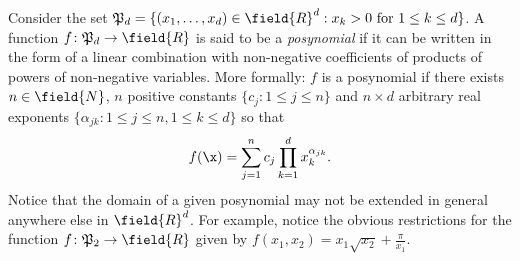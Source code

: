 
\begin{example}[Posynomials]\label{example:posynomial}
Consider the set $\mathfrak{P}_d = \{ (x_1, \dotsc, x_d) \in \field{R}^d : x_k > 0 \text{ for } 1\leq k \leq d\}$. A function $f \colon \mathfrak{P}_d \to \field{R}$ is said to be a \emph{posynomial} if it can be written in the form of a linear combination with non-negative coefficients of products of powers of non-negative variables.  More formally: $f$ is a posynomial if there exists $n \in \field{N}$, $n$ positive constants $\{ c_j : 1 \leq j \leq n \}$ and $n \times d$ arbitrary real exponents $\{ \alpha_{jk} : 1\leq j \leq n, 1 \leq k \leq d \}$ so that 
\begin{equation*}
f(\x) = \sum_{j=1}^n c_j \prod_{k=1}^d x_k^{\alpha_{jk}}.
\end{equation*}
Notice that the domain of a given posynomial may not be extended in general anywhere else in $\field{R}^d$.  For example, notice the obvious restrictions for the function $f\colon \mathfrak{P}_2 \to \field{R}$ given by $f(x_1,x_2) = x_1\sqrt{x_2} + \frac{\pi}{x_1}$.
\end{example}


